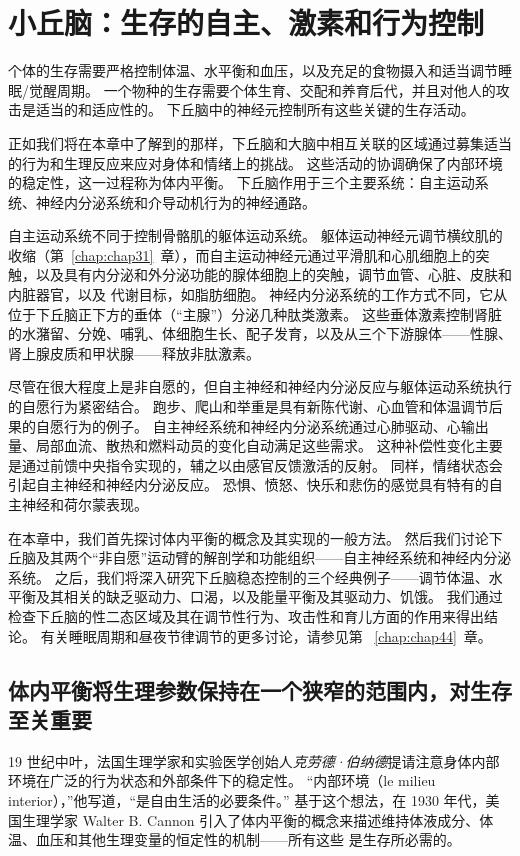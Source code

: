 \chapter{小丘脑：生存的自主、激素和行为控制} \label{chap:chap41}

个体的生存需要严格控制体温、水平衡和血压，以及充足的食物摄入和适当调节睡眠/觉醒周期。
一个物种的生存需要个体生育、交配和养育后代，并且对他人的攻击是适当的和适应性的。
下丘脑中的神经元控制所有这些关键的生存活动。


正如我们将在本章中了解到的那样，下丘脑和大脑中相互关联的区域通过募集适当的行为和生理反应来应对身体和情绪上的挑战。
这些活动的协调确保了内部环境的稳定性，这一过程称为体内平衡。
下丘脑作用于三个主要系统：自主运动系统、神经内分泌系统和介导动机行为的神经通路。


自主运动系统不同于控制骨骼肌的躯体运动系统。 躯体运动神经元调节横纹肌的收缩（第~\ref{chap:chap31}~章），而自主运动神经元通过平滑肌和心肌细胞上的突触，以及具有内分泌和外分泌功能的腺体细胞上的突触，调节血管、心脏、皮肤和内脏器官，以及 代谢目标，如脂肪细胞。
神经内分泌系统的工作方式不同，它从位于下丘脑正下方的垂体（“主腺”）分泌几种肽类激素。
这些垂体激素控制肾脏的水潴留、分娩、哺乳、体细胞生长、配子发育，以及从三个下游腺体——性腺、肾上腺皮质和甲状腺——释放非肽激素。


尽管在很大程度上是非自愿的，但自主神经和神经内分泌反应与躯体运动系统执行的自愿行为紧密结合。
跑步、爬山和举重是具有新陈代谢、心血管和体温调节后果的自愿行为的例子。
自主神经系统和神经内分泌系统通过心肺驱动、心输出量、局部血流、散热和燃料动员的变化自动满足这些需求。
这种补偿性变化主要是通过前馈中央指令实现的，辅之以由感官反馈激活的反射。
同样，情绪状态会引起自主神经和神经内分泌反应。
恐惧、愤怒、快乐和悲伤的感觉具有特有的自主神经和荷尔蒙表现。


在本章中，我们首先探讨体内平衡的概念及其实现的一般方法。
然后我们讨论下丘脑及其两个“非自愿”运动臂的解剖学和功能组织——自主神经系统和神经内分泌系统。
之后，我们将深入研究下丘脑稳态控制的三个经典例子——调节体温、水平衡及其相关的缺乏驱动力、口渴，以及能量平衡及其驱动力、饥饿。
我们通过检查下丘脑的性二态区域及其在调节性行为、攻击性和育儿方面的作用来得出结论。
有关睡眠周期和昼夜节律调节的更多讨论，请参见第 ~\ref{chap:chap44}~章。



\section{体内平衡将生理参数保持在一个狭窄的范围内，对生存至关重要}

19 世纪中叶，法国生理学家和实验医学创始人\textit{克劳德·伯纳德}提请注意身体内部环境在广泛的行为状态和外部条件下的稳定性。
“内部环境（le milieu interior），”他写道，“是自由生活的必要条件。” 
基于这个想法，在 1930 年代，美国生理学家 Walter B. Cannon 引入了体内平衡的概念来描述维持体液成分、体温、血压和其他生理变量的恒定性的机制——所有这些 是生存所必需的。


